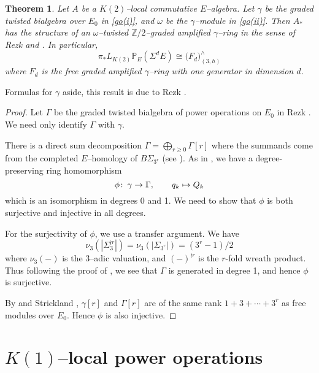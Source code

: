 \documentclass[microtype]{gtpart}     %
\newtheorem{thm}{Theorem}[section]    %
\theoremstyle{remark}
\theoremstyle{definition}
\def\co{\colon\thinspace}
\newcommand{\mb}[1]{\mathbb{#1}}
\newcommand{\BP}{{\mb P}}
\newcommand{\BZ}{{\mb Z}}
\newcommand{\G}{\Gamma}
\newcommand{\g}{\gamma}
\newcommand{\go}[1]{\fullref{def:go}\thinspace \eqref{go(#1)}}
\begin{document}
\begin{thm}
\label{thm:gamma}
 Let $A$ be a $K(2)$--local commutative $E$--algebra.  Let $\g$ be the graded 
 twisted bialgebra over $E_0$ in \go{i}, and $\omega$ be the $\g$--module in 
 \go{ii}.  Then $A_*$ has the structure of an {\em $\omega$--twisted 
 $\BZ/2$--graded amplified $\g$--ring} in the sense of Rezk 
 \cite[Section 2]{cong} and \cite[2.5 and 2.6]{h2p2}.  In particular, 
 \[
  \pi_* L_{K(2)} \BP_E (\Sigma^d E) \cong \big( F_d \big)_{(3,h)}^\wedge 
 \]
 where $F_d$ is the free graded amplified $\g$--ring with one generator in 
 dimension $d$.  
\end{thm}
Formulas for $\g$ aside, this result is due to Rezk \cite{cong, h2p2}.  
\begin{proof}
 Let $\G$ be the graded twisted bialgebra of power operations on $E_0$ in 
 Rezk \cite[Section 6]{cong}.  We need only identify $\G$ with $\g$.  

 There is a direct sum decomposition $\G = \bigoplus_{r \geq 0} \G[r]$ where 
 the summands come from the completed $E$--homology of $B\Sigma_{3^r}$ (see 
 \cite[6.2]{cong}).  As in , we have a degree-preserving 
 ring homomorphism 
 \[
  \phi \co \g \to \G, \qquad q_k \mapsto Q_k 
 \]
 which is an isomorphism in degrees 0 and 1.  We need to show that $\phi$ is 
 both surjective and injective in all degrees.  

 For the surjectivity of $\phi$, we use a transfer argument.  We have 
 \[
  \nu_3(|\Sigma_3^{\wr r}|) = \nu_3(|\Sigma_{3^r}|) = (3^r - 1) / 2 
 \]
 where $\nu_3(-)$ is the 3--adic valuation, and $(-)^{\wr r}$ is the $r$-fold 
 wreath product.  Thus following the proof of \cite[Proposition 3.17]{cong}, 
 we see that $\G$ is generated in degree 1, and hence $\phi$ is surjective.  

 By  and Strickland \cite[Theorem 1.1]{Str98}, $\g[r]$ and 
 $\G[r]$ are of the same rank $1 + 3 + \cdots + 3^r$ as free modules over 
 $E_0$.  Hence $\phi$ is also injective.  
\end{proof}


\section{$K(1)$--local power operations}
\label{sec:K(1)}
\end{document}

